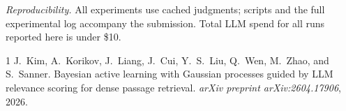\documentclass[11pt]{article}
\theoremstyle{plain}\newtheorem{theorem}{Theorem}\newtheorem{lemma}{Lemma}\newtheorem{proposition}{Proposition}
\theoremstyle{definition}\newtheorem{assumption}{Assumption}\newtheorem{remark}{Remark}
\begin{document}
\smallskip\noindent\footnotesize\emph{Reproducibility.} All experiments use cached judgments; scripts and the full
experimental log accompany the submission. Total LLM spend for all runs reported here is under \$10.

\normalsize
\begin{thebibliography}{1}
 J.~Kim, A.~Korikov, J.~Liang, J.~Cui, Y.~S.~Liu, Q.~Wen, M.~Zhao, and
S.~Sanner. Bayesian active learning with Gaussian processes guided by {LLM} relevance scoring for dense passage
retrieval. \emph{arXiv preprint arXiv:2604.17906}, 2026.
\end{thebibliography}
\end{document}
